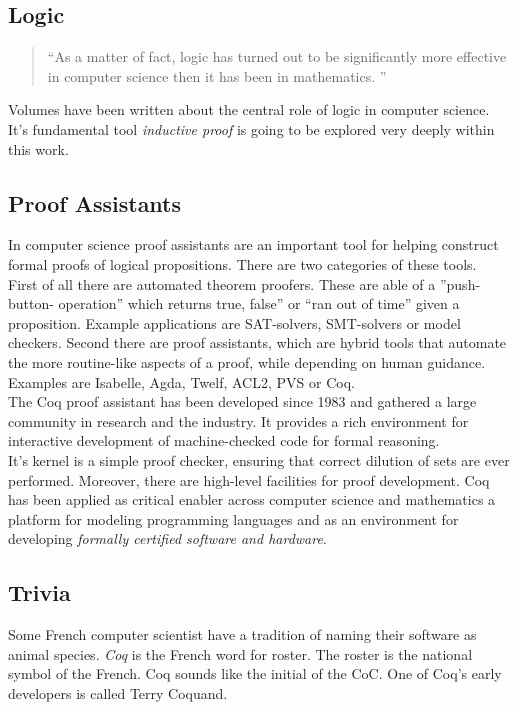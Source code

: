 \subsection{Logic}

\begin{quote}
``As a matter of fact, logic has turned out to be significantly more effective in computer science then it has been in mathematics. '' \cite{PACGGHSY} 
\end{quote}
Volumes have been written about the central role of logic in computer science. 
It's fundamental tool {\itshape inductive proof} is going to be explored very deeply within this work.


\subsection{Proof Assistants}

In computer science proof assistants are an important tool for helping construct formal proofs of logical propositions.
There are two categories of these tools.\\
First of all there are automated theorem proofers. 
These are able of a ''push-button- operation'' which returns true, false'' or ``ran out of time'' given a proposition.
Example applications are \glspl{SAT-solver}, \glspl{SMT-solver} or \glspl{model checker}. 
Second there are proof assistants, which are hybrid tools that automate the more routine-like aspects of a proof, while depending on human guidance. 
Examples are \gls{Isabelle}, Agda, Twelf, ACL2, PVS or Coq.\\
The Coq proof assistant has been developed since 1983 and gathered a large community in research and the industry.
It provides a rich environment for interactive development of machine-checked code for formal reasoning.\\
It's kernel is a simple proof checker, ensuring that correct dilution of sets are ever performed. 
Moreover, there are high-level facilities for proof development.
Coq has been applied as critical enabler across computer science and mathematics a platform for modeling programming languages and as an environment for developing {\itshape formally certified software and hardware}.
 

\subsection{Trivia}

Some French computer scientist have a tradition of naming their software as animal species.
{\itshape Coq} is the French word for roster.
The roster is the national symbol of the French.
Coq sounds like the initial of the \gls{CoC}.
One of Coq's early developers is called Terry Coquand.


